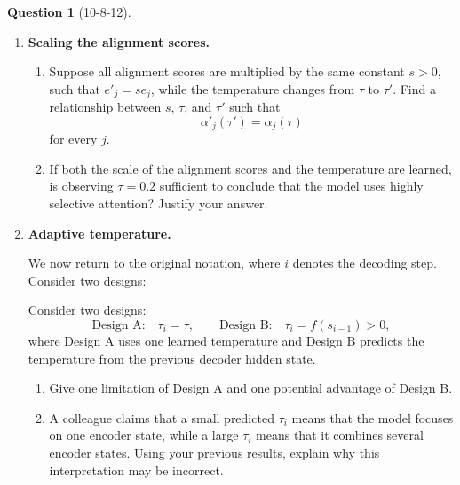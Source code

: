 \documentclass[12pt]{article}
\theoremstyle{definition}
\newtheorem{exercise}{Question}%
\begin{document}
\begin{exercise}[10-8-12]
\begin{enumerate}
    \item \textbf{Scaling the alignment scores.}

    \begin{enumerate}[label=(\alph*)]
        \item Suppose all alignment scores are multiplied by the same constant
        $s>0$, such that $e'_j=se_j$, while the temperature changes from
        $\tau$ to $\tau'$. Find a relationship between $s$, $\tau$, and
        $\tau'$ such that
        \[
        \alpha'_j(\tau')=\alpha_j(\tau)
        \]
        for every $j$.

        \item If both the scale of the alignment scores and the temperature
        are learned, is observing $\tau=0.2$ sufficient to conclude that the
        model uses highly selective attention? Justify your answer.
    \end{enumerate}

    \item \textbf{Adaptive temperature.}

    We now return to the original notation, where $i$ denotes the decoding step.
Consider two designs:

    Consider two designs:
    \[
    \text{Design A:}\quad \tau_i=\tau,
    \qquad
    \text{Design B:}\quad \tau_i=f(s_{i-1})>0,
    \]
    where Design A uses one learned temperature and Design B predicts the
    temperature from the previous decoder hidden state.

    \begin{enumerate}[label=(\alph*)]
        \item Give one limitation of Design A and one potential advantage of
        Design B.

        \item A colleague claims that a small predicted $\tau_i$ means that
        the model focuses on one encoder state, while a large $\tau_i$ means
        that it combines several encoder states. Using your previous results,
        explain why this interpretation may be incorrect.
    \end{enumerate}

\end{enumerate}
\end{exercise}
\end{document}
